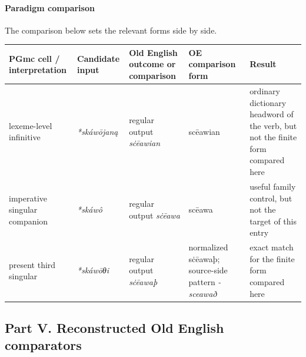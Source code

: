 \documentclass[
  british,
  a4paper,
]{article}
\newcounter{none} %
\begin{document}
\paragraph{Paradigm comparison}\label{paradigm-comparison-27}

The comparison below sets the relevant forms side by side.

{\def\LTcaptype{none} %
\begin{longtable}[]{@{}
  >{\raggedright\arraybackslash}p{}
  >{\raggedright\arraybackslash}p{}
  >{\raggedright\arraybackslash}p{}
  >{\raggedright\arraybackslash}p{}
  >{\raggedright\arraybackslash}p{}@{}}
\toprule\noalign{}
\begin{minipage}[b]{\linewidth}\raggedright
PGmc cell / interpretation
\end{minipage} & \begin{minipage}[b]{\linewidth}\raggedright
Candidate input
\end{minipage} & \begin{minipage}[b]{\linewidth}\raggedright
Old English outcome or comparison
\end{minipage} & \begin{minipage}[b]{\linewidth}\raggedright
OE comparison form
\end{minipage} & \begin{minipage}[b]{\linewidth}\raggedright
Result
\end{minipage} \\
\midrule\noalign{}
\endhead
\bottomrule\noalign{}
\endlastfoot
lexeme-level infinitive & \emph{*skáwōjaną} & regular output
\emph{sċēawian} & scēawian & ordinary dictionary headword of the verb,
but not the finite form compared here \\
imperative singular companion & \emph{*skáwô} & regular output
\emph{sċēawa} & scēawa & useful family control, but not the target of
this entry \\
present third singular & \emph{*skáwōθi} & regular output \emph{sċēawaþ}
& normalized sċēawaþ; source-side pattern \emph{-sceawað} & exact match
for the finite form compared here \\
\end{longtable}
}

\clearpage

\subsection{Part V. Reconstructed Old English
comparators}\label{part-v.-reconstructed-old-english-comparators}
\end{document}

